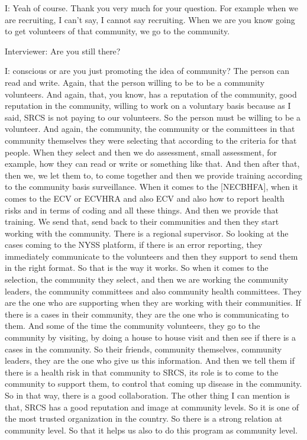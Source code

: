 I: Yeah of course. Thank you very much for your question. For example when we are recruiting, I can't say, I cannot say recruiting. When we are you know going to get volunteers of that community, we go to the community. 

Interviewer:  Are you still there? 

I: conscious or are you just promoting the idea of community? The person can read and write. Again, that the person willing to be to be a community volunteers. And again, that, you know, has a reputation of the community, good reputation in the community, willing to work on a voluntary basis because as I said, SRCS is not paying to our volunteers. So the person must be willing to be a volunteer. And again, the community, the community or the committees in that community themselves they were selecting that according to the criteria for that people. When they select and then we do assessment, small assessment, for example, how they can read or write or something like that. And then after that, then we, we let them to, to come together and then we provide training according to the community basis surveillance. When it comes to the [NECBHFA], when it comes to the ECV or ECVHRA and also ECV and also how to report health risks and in terms of coding and all these things. And then we provide that training. We send that, send back to their communities and then they start working with the community. There is a regional supervisor. So looking at the cases coming to the NYSS platform, if there is an error reporting, they immediately communicate to the volunteers and then they support to send them in the right format. So that is the way it works. So when it comes to the selection, the community they select, and then we are working the community leaders, the community committees and also community health committees. They are the one who are supporting when they are working with their communities. If there is a cases in their community, they are the one who is communicating to them. And some of the time the community volunteers, they go to the community by visiting, by doing a house to house visit and then see if there is a cases in the community. So their friends, community themselves, community leaders, they are the one who give us this information. And then we tell them if there is a health risk in that community to SRCS, its role is to come to the community to support them, to control that coming up disease in the community. So in that way, there is a good collaboration. The other thing I can mention is that, SRCS has a good reputation and image at community levels. So it is one of the most trusted organization in the country. So there is a strong relation at community level. So that it helps us also to do this program as community level. 

